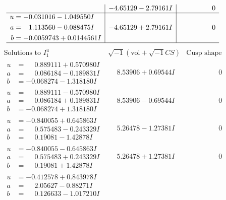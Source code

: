 \documentclass[1p]{elsarticle_modified}
\theoremstyle{definition}
\newcommand{\I}{\sqrt{-1}}
\begin{document}
$$\begin{array}{c|c|c}
 & -4.65129 - 2.79161 I & \phantom{-0.000000 } 0 \\ \hline\begin{aligned}
u &= -0.031016 - 1.049550 I \\
a &= \phantom{-}1.113560 - 0.088475 I \\
b &= -0.0059743 + 0.0144561 I\end{aligned}
 & -4.65129 + 2.79161 I & \phantom{-0.000000 } 0\\
 \hline 
 \end{array}$$\newpage$$\begin{array}{c|c|c}  
\text{Solutions to }I^u_{1}& \I (\text{vol} + \sqrt{-1}CS) & \text{Cusp shape}\\
 \hline 
\begin{aligned}
u &= \phantom{-}0.889111 + 0.570980 I \\
a &= \phantom{-}0.086184 - 0.189831 I \\
b &= -0.068274 - 1.318180 I\end{aligned}
 & \phantom{-}8.53906 + 0.69544 I & \phantom{-0.000000 } 0 \\ \hline\begin{aligned}
u &= \phantom{-}0.889111 - 0.570980 I \\
a &= \phantom{-}0.086184 + 0.189831 I \\
b &= -0.068274 + 1.318180 I\end{aligned}
 & \phantom{-}8.53906 - 0.69544 I & \phantom{-0.000000 } 0 \\ \hline\begin{aligned}
u &= -0.840055 + 0.645863 I \\
a &= \phantom{-}0.575483 - 0.243329 I \\
b &= \phantom{-}0.19081 - 1.42878 I\end{aligned}
 & \phantom{-}5.26478 - 1.27381 I & \phantom{-0.000000 } 0 \\ \hline\begin{aligned}
u &= -0.840055 - 0.645863 I \\
a &= \phantom{-}0.575483 + 0.243329 I \\
b &= \phantom{-}0.19081 + 1.42878 I\end{aligned}
 & \phantom{-}5.26478 + 1.27381 I & \phantom{-0.000000 } 0 \\ \hline\begin{aligned}
u &= -0.412578 + 0.843978 I \\
a &= \phantom{-}2.05627 - 0.88271 I \\
b &= \phantom{-}0.126633 - 1.017210 I\end{aligned}

\end{array}$$
\end{document}
